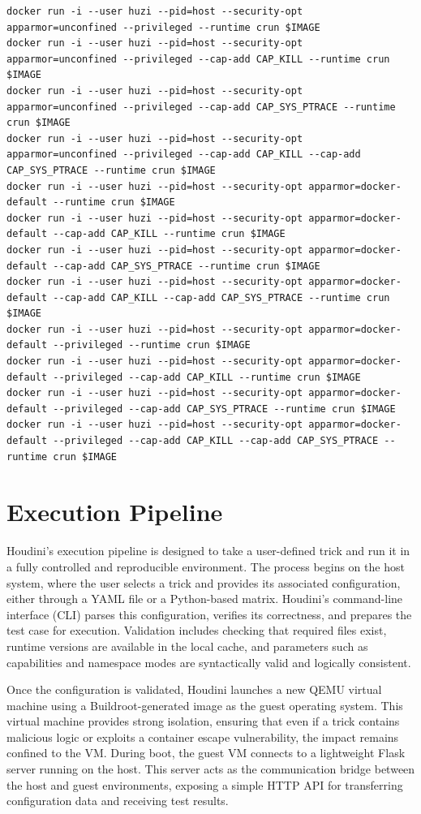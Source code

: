 \documentclass[12pt]{report}
\begin{document}
\begin{doublespace}
\begin{lstlisting}
docker run -i --user huzi --pid=host --security-opt apparmor=unconfined --privileged --runtime crun $IMAGE
docker run -i --user huzi --pid=host --security-opt apparmor=unconfined --privileged --cap-add CAP_KILL --runtime crun $IMAGE
docker run -i --user huzi --pid=host --security-opt apparmor=unconfined --privileged --cap-add CAP_SYS_PTRACE --runtime crun $IMAGE
docker run -i --user huzi --pid=host --security-opt apparmor=unconfined --privileged --cap-add CAP_KILL --cap-add CAP_SYS_PTRACE --runtime crun $IMAGE
docker run -i --user huzi --pid=host --security-opt apparmor=docker-default --runtime crun $IMAGE
docker run -i --user huzi --pid=host --security-opt apparmor=docker-default --cap-add CAP_KILL --runtime crun $IMAGE
docker run -i --user huzi --pid=host --security-opt apparmor=docker-default --cap-add CAP_SYS_PTRACE --runtime crun $IMAGE
docker run -i --user huzi --pid=host --security-opt apparmor=docker-default --cap-add CAP_KILL --cap-add CAP_SYS_PTRACE --runtime crun $IMAGE
docker run -i --user huzi --pid=host --security-opt apparmor=docker-default --privileged --runtime crun $IMAGE
docker run -i --user huzi --pid=host --security-opt apparmor=docker-default --privileged --cap-add CAP_KILL --runtime crun $IMAGE
docker run -i --user huzi --pid=host --security-opt apparmor=docker-default --privileged --cap-add CAP_SYS_PTRACE --runtime crun $IMAGE
docker run -i --user huzi --pid=host --security-opt apparmor=docker-default --privileged --cap-add CAP_KILL --cap-add CAP_SYS_PTRACE --runtime crun $IMAGE
\end{lstlisting}




\section{Execution Pipeline}

Houdini’s execution pipeline is designed to take a user-defined trick and run it in a fully controlled and reproducible environment. The process begins on the host system, where the user selects a trick and provides its associated configuration, either through a YAML file or a Python-based matrix. Houdini’s command-line interface (CLI) parses this configuration, verifies its correctness, and prepares the test case for execution. Validation includes checking that required files exist, runtime versions are available in the local cache, and parameters such as capabilities and namespace modes are syntactically valid and logically consistent.

Once the configuration is validated, Houdini launches a new QEMU virtual machine using a Buildroot-generated image as the guest operating system. This virtual machine provides strong isolation, ensuring that even if a trick contains malicious logic or exploits a container escape vulnerability, the impact remains confined to the VM. During boot, the guest VM connects to a lightweight Flask server running on the host. This server acts as the communication bridge between the host and guest environments, exposing a simple HTTP API for transferring configuration data and receiving test results.


\end{doublespace}
\end{document}
